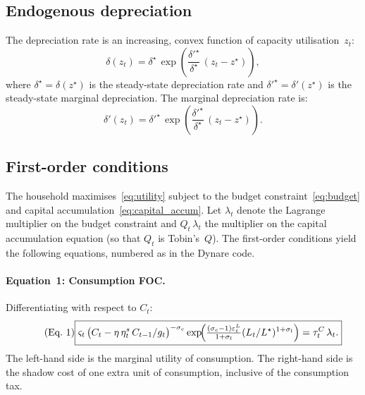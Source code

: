 \documentclass[11pt,a4paper]{article}
\begin{document}
\subsection{Endogenous depreciation}

The depreciation rate is an increasing, convex function of capacity
utilisation~$z_t$:
\begin{equation}\label{eq:depreciation}
  \delta(z_t) = \delta^{\star} \, \exp\!\left(
    \frac{{\delta'}^{\star}}{\delta^{\star}}\,(z_t - z^{\star})\right),
\end{equation}
where $\delta^{\star} = \delta(z^{\star})$ is the steady-state depreciation rate and
${\delta'}^{\star} = \delta'(z^{\star})$ is the steady-state marginal depreciation.
The marginal depreciation rate is:
\begin{equation}\label{eq:depreciation_deriv}
  \delta'(z_t) = {\delta'}^{\star} \, \exp\!\left(
    \frac{{\delta'}^{\star}}{\delta^{\star}}\,(z_t - z^{\star})\right).
\end{equation}

\subsection{First-order conditions}

The household maximises~\eqref{eq:utility} subject to the budget
constraint~\eqref{eq:budget} and capital accumulation~\eqref{eq:capital_accum}.
Let $\lambda_t$ denote the Lagrange multiplier on the budget constraint and
$Q_t\,\lambda_t$ the multiplier on the capital accumulation equation (so that
$Q_t$ is Tobin's~$Q$). The first-order conditions yield the following
equations, numbered as in the Dynare code.

\medskip

\paragraph{Equation~1: Consumption FOC.}
Differentiating with respect to $C_t$:
\begin{equation}\label{eq:eq1}\tag{Eq.~1}
  \boxed{
  \varsigma_t\,\bigl(C_t - \eta\,\eta^s_t\,C_{t-1}/g_t\bigr)^{-\sigma_c}
  \exp\!\Bigl(\tfrac{(\sigma_c-1)\varepsilon^L_t}{1+\sigma_l}
  (L_t/L^{\star})^{1+\sigma_l}\Bigr)
  = \tau^C_t\,\lambda_t.}
\end{equation}
The left-hand side is the marginal utility of consumption. The right-hand side
is the shadow cost of one extra unit of consumption, inclusive of the
consumption tax.
\end{document}
